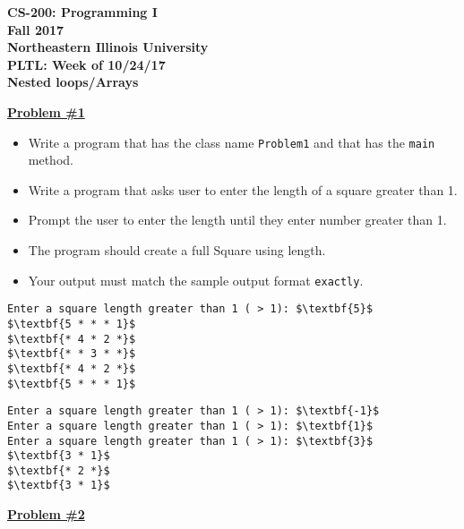 \documentclass[12pt]{article}
\begin{document}
\begin{center}
	\textbf{CS-200: Programming I}\\
	\textbf{Fall 2017}\\
	\textbf{Northeastern Illinois University}\\
	\textbf{PLTL: Week of 10/24/17}\\
	\textbf{Nested loops/Arrays}
\end{center}


\noindent\underline{\textbf{Problem \#1}}
\begin{itemize}
	\item Write a program that has the class name \texttt{Problem1} and that has the \texttt{main} method. 
	\item Write a program that asks user to enter the length of a square greater than 1.
	\item Prompt the user to enter the length until they enter number greater than 1.
	\item The program should create a full Square using length.
	\item Your output must match the sample output format \texttt{exactly}.

\end{itemize}
\begin{center}
\begin{minipage}{8cm}

\begin{lstlisting}[escapechar=$]
Enter a square length greater than 1 ( > 1): $\textbf{5}$
$\textbf{5 * * * 1}$
$\textbf{* 4 * 2 *}$
$\textbf{* * 3 * *}$
$\textbf{* 4 * 2 *}$
$\textbf{5 * * * 1}$
\end{lstlisting}
\end{minipage}
\hspace*{.5cm}
\begin{minipage}{8cm}
\begin{lstlisting}[escapechar=$]
Enter a square length greater than 1 ( > 1): $\textbf{-1}$
Enter a square length greater than 1 ( > 1): $\textbf{1}$
Enter a square length greater than 1 ( > 1): $\textbf{3}$
$\textbf{3 * 1}$
$\textbf{* 2 *}$
$\textbf{3 * 1}$
\end{lstlisting}
\end{minipage}
\end{center}
\vspace*{0.5cm}
\noindent\underline{\textbf{Problem \#2}}
\end{document}
